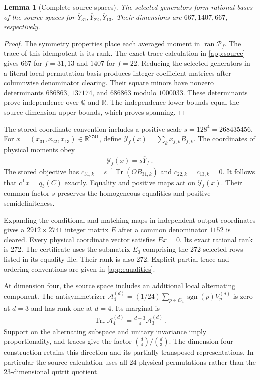 \documentclass[aps,pra,reprint,superscriptaddress,amsmath,amssymb,floatfix,nofootinbib]{revtex4-2}
\newcommand{\Tr}{\operatorname{Tr}}
\newcommand{\ran}{\operatorname{ran}}
\newcommand{\R}{\mathbb R}
\newcommand{\Q}{\mathbb Q}
\newcommand{\Sfour}{\mathfrak S_4}
\newtheorem{lemma}[theorem]{Lemma}
\begin{document}
\begin{lemma}[Complete source spaces]
\label{lem:source-complete}
The selected generators form rational bases of the source spaces for
$\overline Y_{31},\overline Y_{22},\overline Y_{13}$.
Their dimensions are $667,1407,667$, respectively.
\end{lemma}

\begin{proof}
The symmetry properties place each averaged moment in
$\ran\mathcal P_f$. The trace of this idempotent is its rank.
The exact trace calculation in \cref{app:source} gives $667$ for
$f=31,13$ and $1407$ for $f=22$.
Reducing the selected generators in a literal local permutation basis
produces integer coefficient matrices after columnwise denominator
clearing. Their square minors have nonzero determinants $686863$,
$137174$, and $686863$ modulo $1000033$.
These determinants prove independence over $\Q$ and $\R$.
The independence lower bounds equal the source dimension upper bounds,
which proves spanning.
\end{proof}

The stored coordinate convention includes a positive scale
$s=128^4=268435456$.
For $x=(x_{31},x_{22},x_{13})\in\R^{2741}$, define
$\mathcal Y_f(x)=\sum_k x_{f,k}B_{f,k}$.
The coordinates of physical moments obey
\begin{align}
 \mathcal Y_f(x)=s\overline Y_f\ .
 \label{eq:matched-source-scale}
\end{align}
The stored objective has
$c_{31,k}=s^{-1}\Tr(OB_{31,k})$ and $c_{22,k}=c_{13,k}=0$.
It follows that $c^{\mathsf T}x=q_3(C)$ exactly.
Equality and positive maps act on $\mathcal Y_f(x)$.
Their common factor $s$ preserves the homogeneous equalities and
positive semidefiniteness.

Expanding the conditional and matching maps in independent output
coordinates gives a $2912\times2741$ integer matrix $E$ after a common
denominator $1152$ is cleared. Every physical coordinate vector satisfies
$Ex=0$. Its exact rational rank is 272.
The certificate uses the submatrix $E_0$ comprising the 272 selected rows
listed in its equality file. Their rank is also 272.
Explicit partial-trace and ordering conventions are given in
\cref{app:equalities}.

At dimension four, the source space includes an additional local
alternating component. The antisymmetrizer
$\mathcal A_4^{(d)}=(1/24)\sum_{p\in\Sfour}\operatorname{sgn}(p)V_p^{(d)}$
is zero at $d=3$ and has rank one at $d=4$.
Its marginal is
\begin{align}
 \Tr_r\mathcal A_4^{(d)}=\frac{d-3}{4}\mathcal A_3^{(d)}\ .
 \label{eq:alternating-marginal}
\end{align}
Support on the alternating subspace and unitary invariance imply
proportionality, and traces give the factor
$\binom d4/\binom d3$.
The dimension-four construction retains this direction and its partially
transposed representations. In particular the source calculation uses
all 24 physical permutations rather than the 23-dimensional qutrit
quotient.
\end{document}
